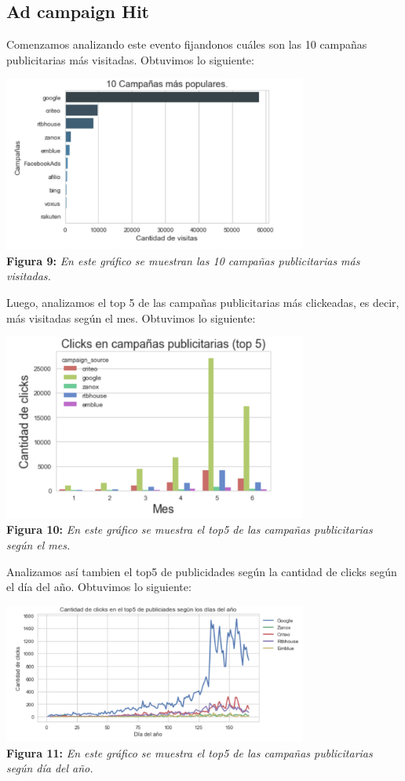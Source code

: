 \documentclass[titlepage,a4paper]{article}
\begin{document}
	\subsection{Ad campaign Hit}
	Comenzamos analizando este evento fijandonos cuáles son las 10 campañas publicitarias más visitadas. Obtuvimos lo siguiente:
	\begin{center}
	\includegraphics[width=10cm] {10campaniasmasPopulares.jpg}\\
	\textbf{Figura 9:}  \textit{En este gráfico se muestran las 10 campañas publicitarias más visitadas.  }
	\end{center}
	Luego, analizamos el top 5 de las campañas publicitarias más clickeadas, es decir, más visitadas según el mes. Obtuvimos lo siguiente: 
	\begin{center}
	\includegraphics[width=10cm] {top5campaniasPublicitariasMasImportantesSegunMes.jpg}\\
	\textbf{Figura 10:}  \textit{En este gráfico se muestra el top5 de las campañas publicitarias según el mes.  }
	\end{center}
	Analizamos así tambien el top5 de publicidades según la cantidad de clicks según el día del año. Obtuvimos lo siguiente:

	\begin{center}
	\includegraphics[width=10cm] {cantidadDeClicksSegunDiaDelAnio.jpg}\\
	\textbf{Figura 11:}  \textit{En este gráfico se muestra el top5 de las campañas publicitarias según día del año.  }
	\end{center}

	
	
	
\end{document}

